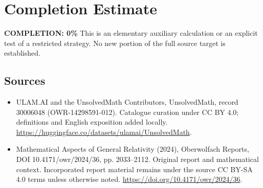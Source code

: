 \documentclass[11pt]{article}
\begin{document}
\section{Completion Estimate}
\noindent\textbf{COMPLETION: 0\%}
This is an elementary auxiliary calculation or an explicit test of a restricted strategy. No new portion of the full source target is established.

\subsection{Sources}
\begin{itemize}
\item[\hypertarget{source:30006048:1}{S1}] ULAM.AI and the UnsolvedMath Contributors, UnsolvedMath, record 30006048 (OWR-14298591-012). Catalogue curation under CC BY 4.0; definitions and English exposition added locally.
\url{https://huggingface.co/datasets/ulamai/UnsolvedMath}.
\item[\hypertarget{source:30006048:2}{S2}] Mathematical Aspects of General Relativity (2024), Oberwolfach Reports, DOI 10.4171/owr/2024/36, pp. 2033--2112. Original report and mathematical context. Incorporated report material remains under the source CC BY-SA 4.0 terms unless otherwise noted.
\url{https://doi.org/10.4171/owr/2024/36}.
\end{itemize}
\label{end:30006048}
\end{document}
